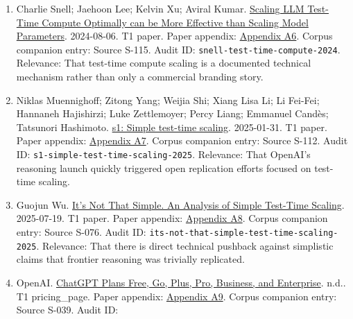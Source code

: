 \documentclass[
  american,
  11pt,
  letterpaper,
]{article}
\begin{document}
\begin{enumerate}
{  OpenAI working on new reasoning technology under code name
  `Strawberry'}. 2024-07-15. T2 news\_article. Paper appendix:
  \hyperref[ch-06-appendix-a5-exclusive-openai-working-on-new-reasoning-technology-under-code-name-strawberry]{Appendix
  A5}. Corpus companion entry: Source S-111. Audit ID:
  \texttt{reuters-strawberry-reasoning-2024}. Relevance: That by
  mid-July 2024 Reuters had published serious reporting about an OpenAI
  reasoning project under the codename \texttt{Strawberry}.
\item
  Charlie Snell; Jaehoon Lee; Kelvin Xu; Aviral Kumar.
  \href{https://arxiv.org/abs/2408.03314}{Scaling LLM Test-Time Compute
  Optimally can be More Effective than Scaling Model Parameters}.
  2024-08-06. T1 paper. Paper appendix:
  \hyperref[ch-06-appendix-a6-scaling-llm-test-time-compute-optimally-can-be-more-effective-than-scaling-model-parameters]{Appendix
  A6}. Corpus companion entry: Source S-115. Audit ID:
  \texttt{snell-test-time-compute-2024}. Relevance: That test-time
  compute scaling is a documented technical mechanism rather than only a
  commercial branding story.
\item
  Niklas Muennighoff; Zitong Yang; Weijia Shi; Xiang Lisa Li; Li
  Fei-Fei; Hannaneh Hajishirzi; Luke Zettlemoyer; Percy Liang; Emmanuel
  Candès; Tatsunori Hashimoto.
  \href{https://arxiv.org/abs/2501.19393}{s1: Simple test-time scaling}.
  2025-01-31. T1 paper. Paper appendix:
  \hyperref[ch-06-appendix-a7-s1-simple-test-time-scaling]{Appendix A7}.
  Corpus companion entry: Source S-112. Audit ID:
  \texttt{s1-simple-test-time-scaling-2025}. Relevance: That OpenAI's
  reasoning launch quickly triggered open replication efforts focused on
  test-time scaling.
\item
  Guojun Wu. \href{https://arxiv.org/abs/2507.14419}{It's Not That
  Simple. An Analysis of Simple Test-Time Scaling}. 2025-07-19. T1
  paper. Paper appendix:
  \hyperref[ch-06-appendix-a8-it-s-not-that-simple-an-analysis-of-simple-test-time-scaling]{Appendix
  A8}. Corpus companion entry: Source S-076. Audit ID:
  \texttt{its-not-that-simple-test-time-scaling-2025}. Relevance: That
  there is direct technical pushback against simplistic claims that
  frontier reasoning was trivially replicated.
\item
  OpenAI. \href{https://chatgpt.com/pricing/}{ChatGPT Plans \textbar{}
  Free, Go, Plus, Pro, Business, and Enterprise}. n.d.. T1
  pricing\_page. Paper appendix:
  \hyperref[ch-06-appendix-a9-chatgpt-plans-free-go-plus-pro-business-and-enterprise]{Appendix
  A9}. Corpus companion entry: Source S-039. Audit ID:

\end{enumerate}
\end{document}
